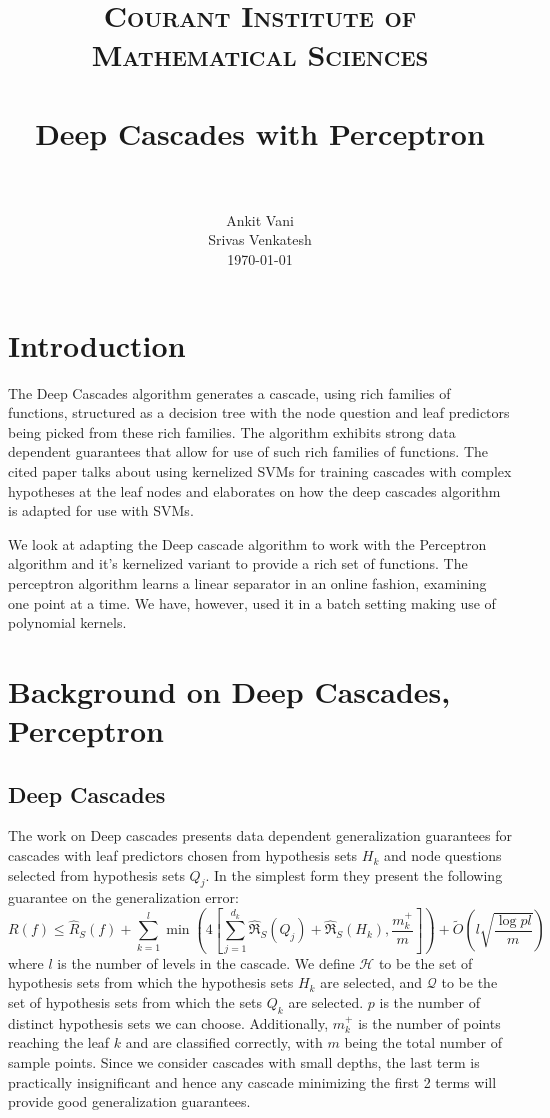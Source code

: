 \documentclass[paper=letter, fontsize=11pt]{scrartcl}
\title{
		\usefont{OT1}{bch}{b}{n}
		\normalfont \normalsize \textsc{Courant Institute of Mathematical Sciences} \\ [25pt]
		\horrule{0.5pt} \\[0.4cm]
		\huge Deep Cascades with Perceptron \\
		\horrule{2pt} \\[0.5cm]
}
\author{
		\normalfont 								\normalsize
        Ankit Vani\\ \normalsize Srivas Venkatesh\\[-3pt]		\normalsize
        \today
}
\date{}
\numberwithin{equation}{section}		%
\numberwithin{figure}{section}			%
\numberwithin{table}{section}				%
\begin{document}
\maketitle
\section{Introduction}


The Deep Cascades \cite{deepcascades} algorithm generates a cascade, using rich families of functions, structured as a decision tree with the node question and leaf predictors being picked from these rich families. The algorithm exhibits strong data dependent guarantees that allow for use of such rich families of functions. The cited paper talks about using kernelized SVMs for training cascades with complex hypotheses at the leaf nodes and elaborates on how the deep cascades algorithm is adapted for use with SVMs.

We look at adapting the Deep cascade algorithm to work with the Perceptron algorithm \cite{rosenblatt1958perceptron} and it's kernelized variant \cite{kernelizedperceptron} to provide a rich set of functions. The perceptron algorithm learns a linear separator in an online fashion, examining one point at a time. We have, however, used it in a batch setting making use of polynomial kernels.
\section{Background on Deep Cascades, Perceptron}
\subsection{Deep Cascades}
The work on Deep cascades presents data dependent generalization guarantees for cascades with leaf predictors chosen from hypothesis sets $H_k$ and node questions selected from hypothesis sets $Q_j$. In the simplest form they present the following guarantee on the generalization error:
\begin{equation}
R(f) \leq \widehat{R}_S(f) + \sum_{k=1}^{l} \min \left( 4\left[ \sum_{j=1}^{d_k} \widehat{\mathfrak{R}}_S(Q_j) + \widehat{\mathfrak{R}}_S(H_k), \frac{m_k^+}{m} \right] \right)	 + \widetilde{O} \left( l \sqrt{\frac{\log pl}{m}} \right)
\label{dcbound}
\end{equation}
where $l$ is the number of levels in the cascade. We define $\mathcal{H}$ to be the set of hypothesis sets from which the hypothesis sets $H_k$ are selected, and $\mathcal{Q}$ to be the set of hypothesis sets from which the sets $Q_k$ are selected. $p$ is the number of distinct hypothesis sets we can choose. Additionally, $m_k^+$ is the number of points reaching the leaf $k$ and are classified correctly, with $m$ being the total number of sample points. Since we consider cascades with small depths, the last term is practically insignificant and hence any cascade minimizing the first 2 terms will provide good generalization guarantees.
\end{document}
